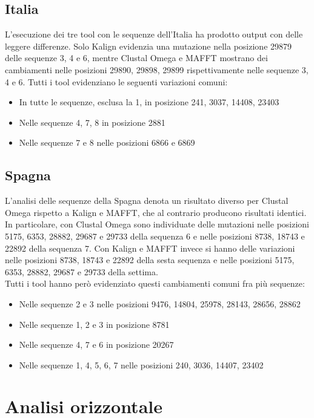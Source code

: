 \documentclass[a4paper,10pt]{article}
\begin{document}
\subsection{Italia} %
L'esecuzione dei tre tool con le sequenze dell'Italia ha prodotto output con delle leggere differenze. Solo Kalign evidenzia una mutazione nella posizione 29879 delle sequenze 3, 4 e 6, mentre Clustal Omega e MAFFT mostrano dei cambiamenti nelle posizioni 29890, 29898, 29899 rispettivamente nelle sequenze 3, 4 e 6.
Tutti i tool evidenziano le seguenti variazioni comuni:
\begin{itemize}
\item In tutte le sequenze, esclusa la 1, in posizione 241, 3037, 14408, 23403
\item Nelle sequenze 4, 7, 8 in posizione 2881 
\item Nelle sequenze 7 e 8 nelle posizioni 6866 e 6869
\end{itemize}


\subsection{Spagna}
L'analisi delle sequenze della Spagna denota un risultato diverso per Clustal Omega rispetto a Kalign e MAFFT, che al contrario producono risultati identici. \\
In particolare, con Clustal Omega sono individuate delle mutazioni nelle posizioni  5175, 6353, 28882, 29687 e 29733 della sequenza 6 e nelle posizioni 8738, 18743 e 22892 della sequenza 7.
Con Kalign e MAFFT invece si hanno delle variazioni nelle posizioni 8738, 18743 e 22892 della sesta sequenza e nelle posizioni 5175, 6353, 28882, 29687 e 29733 della settima. \\
Tutti i tool hanno però evidenziato questi cambiamenti comuni fra più sequenze:

\begin{itemize}
\item Nelle sequenze 2 e 3 nelle posizioni 9476, 14804, 25978, 28143, 28656, 28862
\item Nelle sequenze 1, 2 e 3 in posizione 8781
\item Nelle sequenze 4, 7 e 6 in posizione 20267
\item Nelle sequenze 1, 4, 5, 6, 7 nelle posizioni 240, 3036, 14407, 23402
\end{itemize}


\section{Analisi orizzontale}
\end{document}
